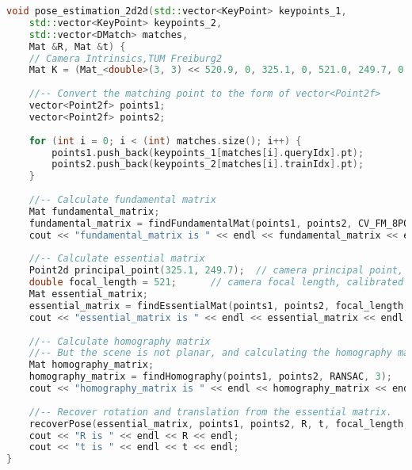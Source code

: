 \begin{lstlisting}[language=c++,caption=slambook2/ch7/pose_estimation_2d2d.cpp （片段）]
void pose_estimation_2d2d(std::vector<KeyPoint> keypoints_1,
    std::vector<KeyPoint> keypoints_2,
    std::vector<DMatch> matches,
    Mat &R, Mat &t) {
    // Camera Intrinsics,TUM Freiburg2
    Mat K = (Mat_<double>(3, 3) << 520.9, 0, 325.1, 0, 521.0, 249.7, 0, 0, 1);
    
    //-- Convert the matching point to the form of vector<Point2f>
    vector<Point2f> points1;
    vector<Point2f> points2;
    
    for (int i = 0; i < (int) matches.size(); i++) {
        points1.push_back(keypoints_1[matches[i].queryIdx].pt);
        points2.push_back(keypoints_2[matches[i].trainIdx].pt);
    }
    
    //-- Calculate fundamental matrix
    Mat fundamental_matrix;
    fundamental_matrix = findFundamentalMat(points1, points2, CV_FM_8POINT);
    cout << "fundamental_matrix is " << endl << fundamental_matrix << endl;
    
    //-- Calculate essential matrix
    Point2d principal_point(325.1, 249.7);  // camera principal point, calibrated in TUM dataset
    double focal_length = 521;      // camera focal length, calibrated in TUM dataset
    Mat essential_matrix;
    essential_matrix = findEssentialMat(points1, points2, focal_length, principal_point);
    cout << "essential_matrix is " << endl << essential_matrix << endl;
    
    //-- Calculate homography matrix
    //-- But the scene is not planar, and calculating the homography matrix here is of little significance
    Mat homography_matrix;
    homography_matrix = findHomography(points1, points2, RANSAC, 3);
    cout << "homography_matrix is " << endl << homography_matrix << endl;
    
    //-- Recover rotation and translation from the essential matrix.
    recoverPose(essential_matrix, points1, points2, R, t, focal_length, principal_point);
    cout << "R is " << endl << R << endl;
    cout << "t is " << endl << t << endl;
}
\end{lstlisting}

